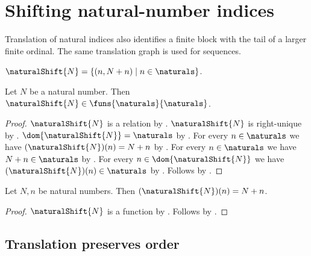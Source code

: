 \section{Shifting natural-number indices}




Translation of natural indices also identifies a finite block with the tail
of a larger finite ordinal. The same translation graph is used for sequences.

\begin{definition}\label{natural_shift}
    $\naturalShift{N}=\{(n,N+n)\mid n\in\naturals\}$.
\end{definition}

\begin{theorem}\label{natural_shift_is_function}
    Let $N$ be a natural number.
    Then $\naturalShift{N}\in\funs{\naturals}{\naturals}$.
\end{theorem}
\begin{proof}
    $\naturalShift{N}$ is a relation by
        .
    $\naturalShift{N}$ is right-unique by
        .
    $\dom{\naturalShift{N}}=\naturals$ by
        .
    For every $n\in\naturals$ we have
        $(\naturalShift{N})(n)=N+n$ by
        .
    For every $n\in\naturals$ we have $N+n\in\naturals$ by
        .
    For every $n\in\dom{\naturalShift{N}}$ we have
        $(\naturalShift{N})(n)\in\naturals$ by \auto.
    Follows by .
\end{proof}

\begin{proposition}\label{natural_shift_apply}
    Let $N,n$ be natural numbers.
    Then $(\naturalShift{N})(n)=N+n$.
\end{proposition}
\begin{proof}
    $\naturalShift{N}$ is a function by
        .
    Follows by .
\end{proof}

\subsection{Translation preserves order}

